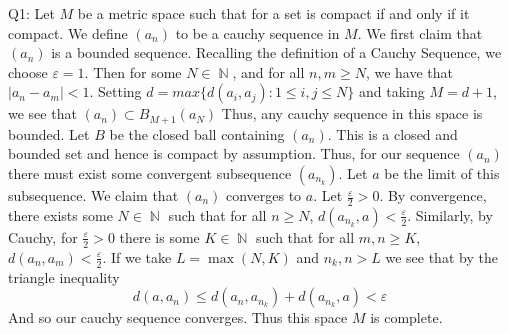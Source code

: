 \documentclass[letterpaper]{article}
\DeclareMathOperator{\N}{\mathbb{N}}
\begin{document}
\noindent Q1: Let $M$ be a metric space such that for a set is compact if and only if it compact. We define $(a_n)$ to be a cauchy sequence in $M$. 
We first claim that $(a_n)$ is a bounded sequence. Recalling the definition of a Cauchy Sequence, we choose $\varepsilon = 1$. Then for some $N\in \N$, and for all $n,m\geq N$, we have that $|a_n-a_m|<1$. Setting $d=max\{d(a_i,a_j): 1\leq i,j\leq N\}$ and taking $M=d+1$, we see that $(a_n)\subset B_{M+1}(a_N)$
Thus, any cauchy sequence in this space is bounded. Let $B$ be the closed ball containing $(a_n)$. This is a closed and bounded set and hence is compact by assumption. Thus, for our sequence $(a_n)$ there must exist some convergent subsequence $(a_{n_k})$. Let $a$ be the limit of this subsequence. We claim that $(a_n)$ converges to $a$. Let $\frac{\varepsilon}{2}>0$.
By convergence, there exists some $N\in \N$ such that for all $n\geq N$, $d(a_{n_k},a)< \frac{\varepsilon}{2}$. Similarly, by Cauchy, for $\frac{\varepsilon}{2}>0$ there is some $K\in \N$ such that for all $m,n\geq K$, $d(a_n,a_m)< \frac{\varepsilon}{2}$. If we take $L = \max(N,K)$ and $n_k,n>L$ we see that by the triangle inequality
$$d(a,a_n) \leq d(a_n,a_{n_k}) + d(a_{n_k},a) < \varepsilon$$
And so our cauchy sequence converges. Thus this space $M$ is complete. 
\end{document}
